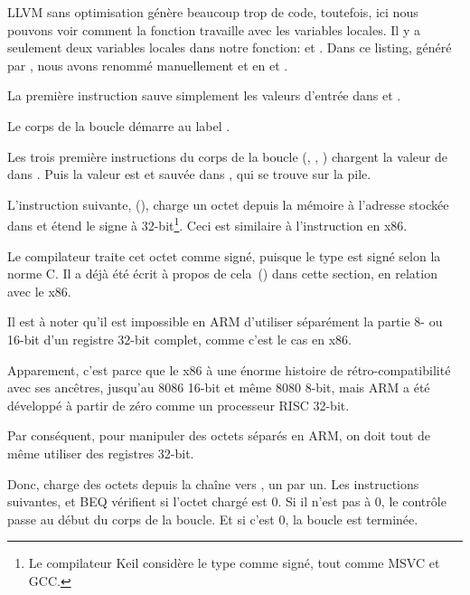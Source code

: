﻿

\mysubparagraph{\NonOptimizingXcodeIV (\ARMMode)}



LLVM sans optimisation génère beaucoup trop de code, toutefois, ici nous pouvons
voir comment la fonction travaille avec les variables locales.
Il y a seulement deux variables locales dans notre fonction:  et .
Dans ce listing, généré par \IDA, nous avons renommé manuellement  et
 en  et .

La première instruction sauve simplement les valeurs d'entrée dans  et .

Le corps de la boucle démarre au label .

Les trois première instructions du corps de la boucle (, \ADD, )
chargent la valeur de  dans .
Puis la valeur est  et sauvée dans , qui
se trouve sur la pile.

L'instruction suivante,  (), charge
un octet depuis la mémoire à l'adresse stockée dans  et étend le signe à
32-bit\footnote{Le compilateur Keil considère le type \Tchar comme signé, tout
comme MSVC et GCC.}.
Ceci est similaire à l'instruction \MOVSX en x86.

Le compilateur traite cet octet comme signé, puisque le type \Tchar est signé selon
la norme C.
Il a déjà été écrit à propos de cela~() dans cette section, en relation
avec le x86.


Il est à noter qu'il est impossible en ARM d'utiliser séparément la partie 8- ou
16-bit d'un registre 32-bit complet, comme c'est le cas en x86.

Apparement, c'est parce que le x86 à une énorme histoire de rétro-compatibilité
avec ses ancêtres, jusqu'au 8086 16-bit et même 8080 8-bit, mais ARM a été développé
à partir de zéro comme un processeur RISC 32-bit.

Par conséquent, pour manipuler des octets séparés en ARM, on doit tout de même utiliser
des registres 32-bit.

Donc,  charge des octets depuis la chaîne vers , un par un.
Les instructions suivantes, \CMP et \ac{BEQ} vérifient si l'octet chargé est 0.
Si il n'est pas à 0, le contrôle passe au début du corps de la boucle.
Et si c'est 0, la boucle est terminée.

